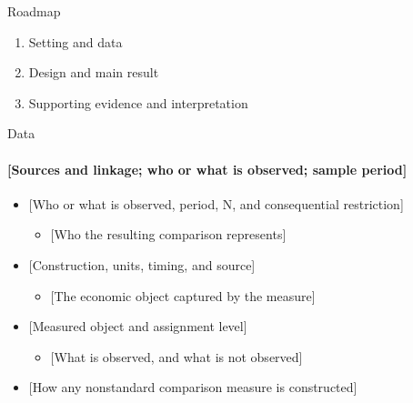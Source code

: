 \documentclass[11pt, aspectratio=169]{beamer}
\begin{document}
\begin{frame}{Roadmap}
  \begin{enumerate}\setlength{\itemsep}{1.1em}
    \item Setting and data
    \item Design and main result
    \item Supporting evidence and interpretation
  \end{enumerate}
\end{frame}

\begin{frame}{Data}
  \framesubtitle{[Sources and linkage; who or what is observed; sample period]}
  \medskip
  \begin{itemize}\setlength{\itemsep}{0.62em}
    \item {} [Who or what is observed, period, N, and consequential restriction]
      \begin{itemize}
        \item {[Who the resulting comparison represents]}
      \end{itemize}
    \item {} [Construction, units, timing, and source]
      \begin{itemize}
        \item {[The economic object captured by the measure]}
      \end{itemize}
    \item {}
      \textcolor{cTreatment}{[Measured object and assignment level]}
      \begin{itemize}
        \item {[What is observed, and what is not observed]}
      \end{itemize}
    \item {} [How any nonstandard comparison measure is constructed]
  \end{itemize}
  \hypertarget{main:sumstats}{}%
\end{frame}
\end{document}
